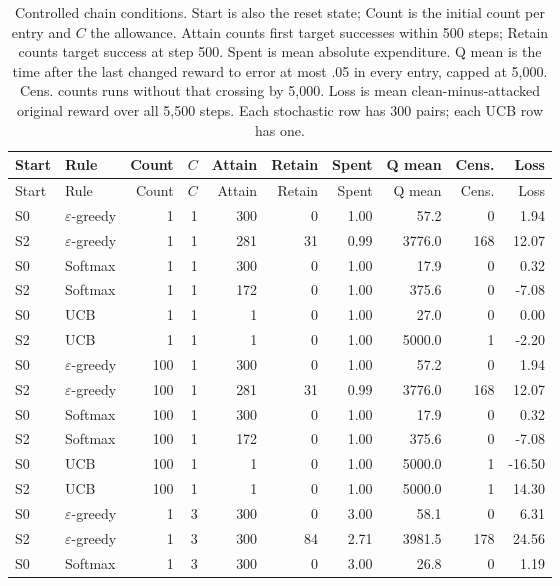 \begingroup\small
\setlength{\tabcolsep}{3.5pt}
\begin{longtable}{llrrrrrrrr}
\caption[Complete controlled chain conditions]{Controlled chain conditions. Start is also the reset state; Count is the initial count per entry and $C$ the allowance. Attain counts first target successes within 500 steps; Retain counts target success at step 500. Spent is mean absolute expenditure. Q mean is the time after the last changed reward to error at most .05 in every entry, capped at 5,000. Cens. counts runs without that crossing by 5,000. Loss is mean clean-minus-attacked original reward over all 5,500 steps. Each stochastic row has 300 pairs; each UCB row has one.}\label{tab:allconditions}\\
\toprule Start & Rule & Count & $C$ & Attain & Retain & Spent & Q mean & Cens. & Loss\\\midrule\endfirsthead
\toprule Start & Rule & Count & $C$ & Attain & Retain & Spent & Q mean & Cens. & Loss\\\midrule\endhead
S0 & $\varepsilon$-greedy & 1 & 1 & 300 & 0 & 1.00 & 57.2 & 0 & 1.94\\
S2 & $\varepsilon$-greedy & 1 & 1 & 281 & 31 & 0.99 & 3776.0 & 168 & 12.07\\
S0 & Softmax & 1 & 1 & 300 & 0 & 1.00 & 17.9 & 0 & 0.32\\
S2 & Softmax & 1 & 1 & 172 & 0 & 1.00 & 375.6 & 0 & -7.08\\
S0 & UCB & 1 & 1 & 1 & 0 & 1.00 & 27.0 & 0 & 0.00\\
S2 & UCB & 1 & 1 & 1 & 0 & 1.00 & 5000.0 & 1 & -2.20\\
S0 & $\varepsilon$-greedy & 100 & 1 & 300 & 0 & 1.00 & 57.2 & 0 & 1.94\\
S2 & $\varepsilon$-greedy & 100 & 1 & 281 & 31 & 0.99 & 3776.0 & 168 & 12.07\\
S0 & Softmax & 100 & 1 & 300 & 0 & 1.00 & 17.9 & 0 & 0.32\\
S2 & Softmax & 100 & 1 & 172 & 0 & 1.00 & 375.6 & 0 & -7.08\\
S0 & UCB & 100 & 1 & 1 & 0 & 1.00 & 5000.0 & 1 & -16.50\\
S2 & UCB & 100 & 1 & 1 & 0 & 1.00 & 5000.0 & 1 & 14.30\\
S0 & $\varepsilon$-greedy & 1 & 3 & 300 & 0 & 3.00 & 58.1 & 0 & 6.31\\
S2 & $\varepsilon$-greedy & 1 & 3 & 300 & 84 & 2.71 & 3981.5 & 178 & 24.56\\
S0 & Softmax & 1 & 3 & 300 & 0 & 3.00 & 26.8 & 0 & 1.19\\

\end{longtable}
